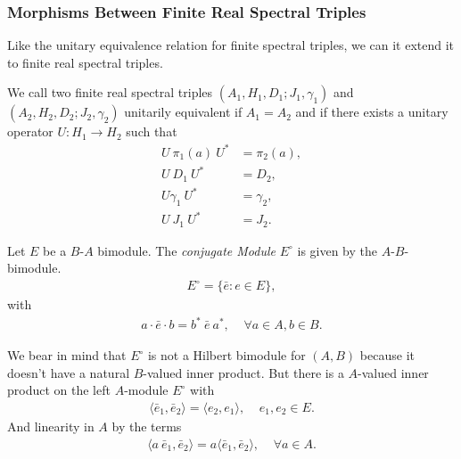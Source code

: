 \subsubsection{Morphisms Between Finite Real Spectral Triples}
Like the unitary equivalence relation for finite spectral triples, we can it
extend it to finite real spectral triples.
\begin{mydefinition}
    We call two finite real spectral triples $(A_1, H_1 ,D_1 ; J_1 , \gamma_1)$
    and $(A_2, H_2, D_2; J_2, \gamma _2)$ unitarily equivalent if $A_1 =
    A_2$ and if there exists a unitary operator $U: H_1 \rightarrow H_2$ such
    that
    \begin{align}
        U\ \pi_1(a)\ U^* &= \pi _2(a),\\
        U\ D_1\ U^* &= D_2,\\
        U \gamma _1\ U^*  &= \gamma _2,\\
        U\ J_1\ U^* &= J_2.
    \end{align}
\end{mydefinition}
\begin{mydefinition}
    Let $E$ be a $B$-$A$ bimodule. The \textit{conjugate Module} $E^\circ$ is
    given by the $A$-$B$-bimodule.
    \begin{align}
        E^\circ = \{\bar{e} : e\in E\},
    \end{align}
    with
    \begin{align}
    a \cdot \bar{e} \cdot b = b^*\ \bar{e}\ a^*, \;\;\;\; \forall a\in A, b \in
        B.
    \end{align}
\end{mydefinition}
We bear in mind that $E^\circ$ is not a Hilbert bimodule for $(A, B)$ because
it doesn't have a natural $B$-valued inner product. But there is a $A$-valued
inner product on the left $A$-module $E^\circ$ with
\begin{align}
    \langle \bar{e}_1, \bar{e}_2 \rangle = \langle e_2 , e_1 \rangle,
    \;\;\;\; e_1, e_2 \in E.
\end{align}
And linearity in $A$ by the terms
\begin{align}
    \langle a\ \bar{e}_1, \bar{e}_2 \rangle = a \langle \bar{e}_1, \bar{e}_2
    \rangle, \;\;\;\; \forall a \in A.
\end{align}

